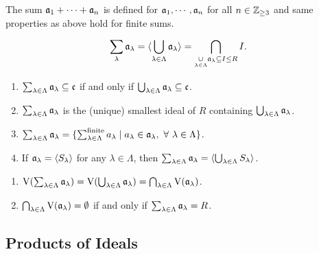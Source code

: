 \begin{remark}
    The sum $\mathfrak{a}_1 + \cdots + \mathfrak{a}_n$ is defined for $\mathfrak{a}_1,\cdots,\mathfrak{a}_n$ for all $n \in \mathbb{Z}_{\geq 3}$ and same properties as above hold for finite sums.
\end{remark}

\begin{definition}
    \[\sum_{\lambda} \mathfrak{a}_\lambda = \langle \bigcup_{\lambda \in \Lambda} \mathfrak{a}_\lambda \rangle = \bigcap_{\underset {\lambda \in \Lambda} \cup \mathfrak{a}_\lambda \subseteq I \leq R} I.\]
\end{definition}

\begin{fact}
    \begin{enumerate}
        \item $\sum_{\lambda \in \Lambda} \mathfrak{a}_\lambda \subseteq \mathfrak{c}$ if and only if $\bigcup_{\lambda \in \Lambda} \mathfrak{a}_\lambda \subseteq \mathfrak{c}$.
        \item $\sum_{\lambda \in \Lambda} \mathfrak{a}_\lambda$ is the (unique) smallest ideal of $R$ containing $\bigcup_{\lambda \in \Lambda} \mathfrak{a}_\lambda$.
        \item $\sum_{\lambda \in \Lambda} \mathfrak{a}_\lambda = \{\sum_{\lambda \in \Lambda}^{\text{finite}}a_\lambda \mid a_\lambda \in \mathfrak{a}_\lambda, \ \forall \  \lambda \in \Lambda\}$.
        \item If $\mathfrak{a}_\lambda = \langle S_\lambda \rangle$ for any $\lambda \in \Lambda$, then $\sum_{\lambda \in \Lambda} \mathfrak{a}_\lambda = \langle \bigcup_{\lambda \in \Lambda}S_\lambda \rangle$.
    \end{enumerate}
\end{fact}

\begin{fact}
    \begin{enumerate}
        \item $\operatorname{V}(\sum_{\lambda \in \Lambda} \mathfrak{a}_\lambda) = \operatorname{V}(\bigcup_{\lambda \in \Lambda} \mathfrak{a}_\lambda) = \bigcap_{\lambda \in \Lambda} \operatorname{V}(\mathfrak{a}_\lambda)$.
        \item $\bigcap_{\lambda \in \Lambda} \operatorname{V}(\mathfrak{a}_\lambda) = \emptyset$ if and only if $\sum_{\lambda \in \Lambda} \mathfrak{a}_\lambda = R$.
    \end{enumerate}
\end{fact}

\subsection*{Products of Ideals}

